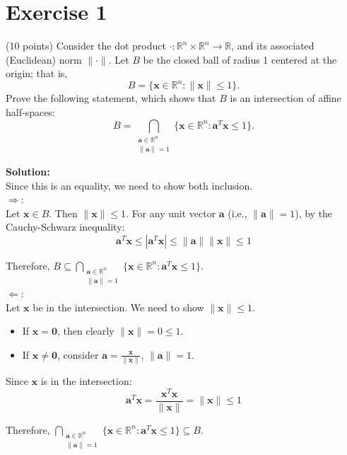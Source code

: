 \documentclass{article}
\begin{document}
\section*{Exercise 1}
(10 points) Consider the dot product $\cdot : \mathbb{R}^n \times \mathbb{R}^n \to \mathbb{R}$, and its associated (Euclidean) norm $\|\cdot\|$. Let $B$ be the closed ball of radius 1 centered at the origin; that is,
\[
    B = \{\mathbf{x} \in \mathbb{R}^n : \|\mathbf{x}\| \leq 1\}.
\]
Prove the following statement, which shows that $B$ is an intersection of affine half-spaces:
\[
    B = \bigcap_{\substack{\mathbf{a}\in\mathbb{R}^n \\ \|\mathbf{a}\|=1}} \{\mathbf{x} \in \mathbb{R}^n : \mathbf{a}^T\mathbf{x} \leq 1\}.
\]

\textbf{Solution:} \\

Since this is an equality, we need to show both inclusion. \\

$\Rightarrow$: \\

Let $\mathbf{x} \in B$. Then $\|\mathbf{x}\| \leq 1$.
For any unit vector $\mathbf{a}$ (i.e., $\|\mathbf{a}\| = 1$), by the Cauchy-Schwarz inequality:
\[
    \mathbf{a}^T\mathbf{x} \leq |\mathbf{a}^T\mathbf{x}| \leq \|\mathbf{a}\|\|\mathbf{x}\| \leq 1
\]

Therefore, $B \subseteq \bigcap_{\substack{\mathbf{a}\in\mathbb{R}^n \\ \|\mathbf{a}\|=1}} \{\mathbf{x} \in \mathbb{R}^n : \mathbf{a}^T\mathbf{x} \leq 1\}$. \\

$\Leftarrow$: \\

Let $\mathbf{x}$ be in the intersection. We need to show $\|\mathbf{x}\| \leq 1$.

\begin{itemize}
    \item If $\mathbf{x} = \mathbf{0}$, then clearly $\|\mathbf{x}\| = 0 \leq 1$.
    \item If $\mathbf{x} \neq \mathbf{0}$, consider $\mathbf{a} = \frac{\mathbf{x}}{\|\mathbf{x}\|}$, $\|\mathbf{a}\| = 1$.
\end{itemize}

Since $\mathbf{x}$ is in the intersection:
\[
    \mathbf{a}^T\mathbf{x} = \frac{\mathbf{x}^T\mathbf{x}}{\|\mathbf{x}\|} = \|\mathbf{x}\| \leq 1
\]

Therefore, $\bigcap_{\substack{\mathbf{a}\in\mathbb{R}^n \\ \|\mathbf{a}\|=1}} \{\mathbf{x} \in \mathbb{R}^n : \mathbf{a}^T\mathbf{x} \leq 1\} \subseteq B$. \\
\end{document}
